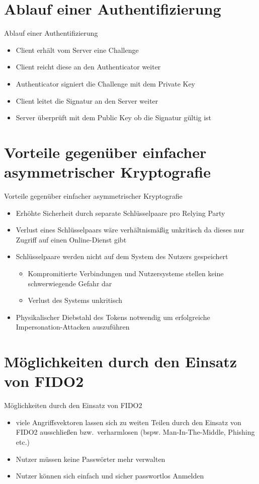\documentclass{beamer}
\begin{document}
\section{Ablauf einer Authentifizierung}
\begin{frame}{Ablauf einer Authentifizierung}
	\begin{itemize}
		\item Client erhält vom Server eine Challenge
		\item Client reicht diese an den Authenticator weiter
		\item Authenticator signiert die Challenge mit dem Private Key
		\item Client leitet die Signatur an den Server weiter
		\item Server überprüft mit dem Public Key ob die Signatur gültig ist
	\end{itemize}
\end{frame}

\section{Vorteile gegenüber einfacher asymmetrischer Kryptografie}
\begin{frame}{Vorteile gegenüber einfacher asymmetrischer Kryptografie}
	\begin{itemize}
		\item Erhöhte Sicherheit durch separate Schlüsselpaare pro Relying Party
		\item Verlust eines Schlüsselpaars wäre verhältnismäßig unkritisch da
			dieses nur Zugriff auf einen Online-Dienst gibt
		\item Schlüsselpaare werden nicht auf dem System des Nutzers gespeichert
			\begin{itemize}
				\item Kompromitierte Verbindungen und Nutzersysteme stellen keine schwerwiegende Gefahr dar
				\item Verlust des Systems unkritisch
			\end{itemize}
		\item Physikalischer Diebstahl des Tokens notwendig um erfolgreiche
			Impersonation-Attacken auszuführen
	\end{itemize}
\end{frame}

\section{Möglichkeiten durch den Einsatz von FIDO2}
\begin{frame}{Möglichkeiten durch den Einsatz von FIDO2}
	\begin{itemize}
		\item viele Angriffsvektoren lassen sich zu weiten Teilen durch den
			Einsatz von FIDO2 ausschließen bzw.\ verharmlosen (bspw.
			Man-In-The-Middle, Phishing etc.)
		\item Nutzer müssen keine Passwörter mehr verwalten
		\item Nutzer können sich einfach und sicher passwortlos Anmelden
	\end{itemize}
\end{frame}
\end{document}
